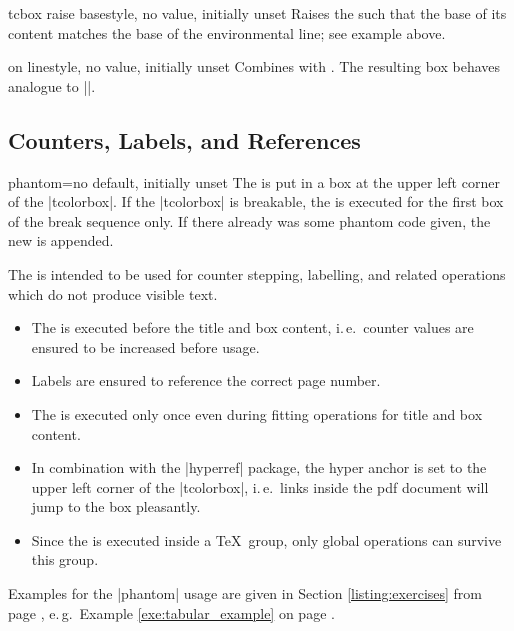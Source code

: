 \begin{docTcbKey}{tcbox raise base}{}{style, no value, initially unset}
  Raises the  such that the base of its content matches
  the base of the environmental line; see example above.
\end{docTcbKey}

\begin{docTcbKey}{on line}{}{style, no value, initially unset}
  Combines  with .
  The resulting box behaves analogue to |\fbox|.
\end{docTcbKey}




\clearpage
\subsection{Counters, Labels, and References}

\begin{docTcbKey}{phantom}{=}{no default, initially unset}
The  is put in a box at the upper left corner of the |tcolorbox|.
If the |tcolorbox| is breakable, the  is executed for the first box of
the break sequence only. If there already was some phantom code given, the
new  is appended.\par
The  is intended to be used for counter stepping, labelling, and
related operations which do not produce visible text.
\begin{itemize}
\item The  is executed before the title and box content, i.\,e.\ counter
  values are ensured to be increased before usage.
\item Labels are ensured to reference the correct page number.
\item The  is executed only once even during fitting operations for
  title and box content.
\item In combination with the |hyperref| package, the hyper anchor is set
  to the upper left corner of the |tcolorbox|, i.\,e.\ links inside the pdf document
  will jump to the box pleasantly.
\item Since the  is executed inside a \TeX\ group, only global
  operations can survive this group.
\end{itemize}
Examples for the |phantom| usage are given in Section \ref{listing:exercises}
from page \pageref{listing:exercises}, e.\,g.\
Example \ref{exe:tabular_example} on page \pageref{exe:tabular_example}.
\end{docTcbKey}

